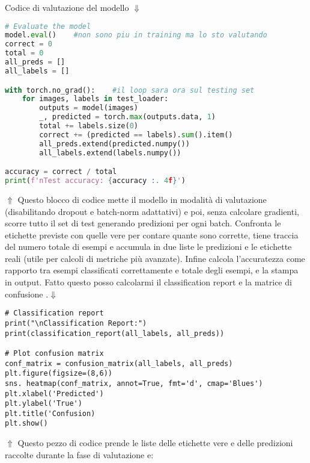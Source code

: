 \documentclass[a4paper,12pt]{article}
\begin{document}
\vspace{2em}
Codice di valutazione del modello $\Downarrow$
\begin{lstlisting}[language=Python, basicstyle=\ttfamily\footnotesize, breaklines=true, frame=single]
# Evaluate the model
model.eval()    #non sono piu in training ma lo sto valutando
correct = 0     
total = 0
all_preds = []
all_labels = []

with torch.no_grad():    #il loop sara ora sul testing set    
    for images, labels in test_loader:  
        outputs = model(images) 
        _, predicted = torch.max(outputs.data, 1)
        total += labels.size(0)
        correct += (predicted == labels).sum().item()
        all_preds.extend(predicted.numpy())
        all_labels.extend(labels.numpy())

accuracy = correct / total
print(f'nTest accuracy: {accuracy :. 4f}')  
\end{lstlisting}
$\Uparrow$ Questo blocco di codice mette il modello in modalità di valutazione (disabilitando dropout e batch‐norm adattativi) e poi, senza calcolare gradienti, scorre tutto il set di test generando predizioni per ogni batch. Confronta le etichette previste con quelle vere per contare quante sono corrette, tiene traccia del numero totale di esempi e accumula in due liste le predizioni e le etichette reali (utile per calcoli di metriche più avanzate). Infine calcola l’accuratezza come rapporto tra esempi classificati correttamente e totale degli esempi, e la stampa in output. 
\newpage
\noindent Fatto questo posso calcolarmi il classification report e la matrice di confusione .$\Downarrow$
\begin{lstlisting}
# Classification report
print("\nClassification Report:")
print(classification_report(all_labels, all_preds))

# Plot confusion matrix
conf_matrix = confusion_matrix(all_labels, all_preds)
plt.figure(figsize=(8,6))
sns. heatmap(conf_matrix, annot=True, fmt='d', cmap='Blues')
plt.xlabel('Predicted')
plt.ylabel('True')
plt.title('Confusion)
plt.show()
\end{lstlisting}
$\Uparrow$ Questo pezzo di codice prende le liste delle etichette vere e delle predizioni raccolte durante la fase di valutazione e:
\end{document}
